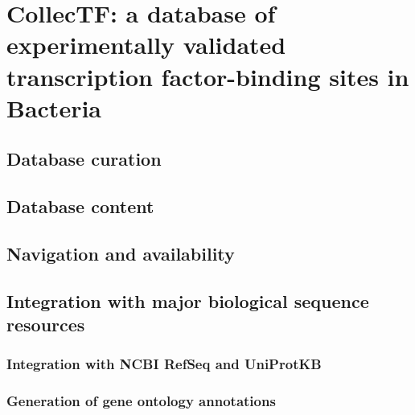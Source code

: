 
\chapter{CollecTF: a database of experimentally validated transcription
factor-binding sites in Bacteria}

\section{Database curation}

\section{Database content}

\section{Navigation and availability}

\section{Integration with major biological sequence resources}

\subsection{Integration with NCBI RefSeq and UniProtKB}

\subsection{Generation of gene ontology annotations}
